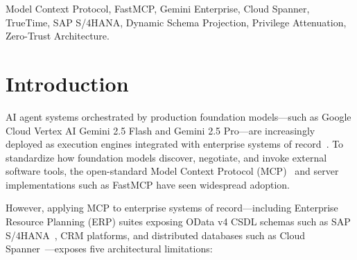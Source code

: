 \documentclass[conference,10pt]{IEEEtran}
\begin{document}
\begin{IEEEkeywords}
Model Context Protocol, FastMCP, Gemini Enterprise, Cloud Spanner, TrueTime, SAP S/4HANA, Dynamic Schema Projection, Privilege Attenuation, Zero-Trust Architecture.
\end{IEEEkeywords}

\section{Introduction}
 AI agent systems orchestrated by production foundation models—such as Google Cloud Vertex AI Gemini 2.5 Flash and Gemini 2.5 Pro—are increasingly deployed as execution engines integrated with enterprise systems of record~\cite{gemini2023team, gemini2024team15, gemini2025report}. To standardize how foundation models discover, negotiate, and invoke external software tools, the open-standard Model Context Protocol (MCP)~\cite{anthropic2024mcp} and server implementations such as FastMCP have seen widespread adoption.

However, applying MCP to enterprise systems of record—including Enterprise Resource Planning (ERP) suites exposing OData v4 CSDL schemas such as SAP S/4HANA~\cite{pizzo2020odata}, CRM platforms, and distributed databases such as Cloud Spanner~\cite{corbett2013spanner}—exposes five architectural limitations:
\end{document}
